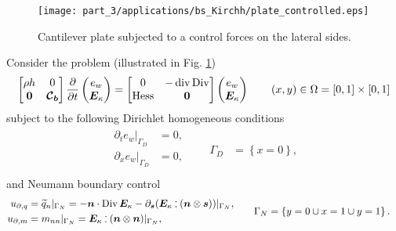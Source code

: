 \begin{figure}[t]
	\centering
	\texttt{[image: part\_3/applications/bs\_Kirchh/plate\_controlled.eps]}
	\caption{Cantilever plate subjected to a control forces on the lateral sides.}
	\label{fig:plate_controlled}
\end{figure}

Consider the problem (illustrated in Fig. \ref{fig:plate_controlled})
\begin{equation*}
\begin{bmatrix}
\rho h & 0 \\ 
\bm{0} & \bm{\mathcal{C}_b} \\
\end{bmatrix}
\diffp{}{t}
\begin{pmatrix}
e_w \\ \bm{E}_\kappa \\
\end{pmatrix} = 
\begin{bmatrix}
0 & -\div\Div \\ 
\Hess & \bm{0} \\
\end{bmatrix}
\begin{pmatrix}
e_w \\ \bm{E}_\kappa \\
\end{pmatrix} \qquad (x, y) \in \Omega = [0, 1]\times[0,1]
\end{equation*}
subject to the following Dirichlet homogeneous conditions
\begin{align*}
\begin{aligned}
\partial_t e_w|_{\Gamma_D} &= 0, \\
\partial_x e_w|_{\Gamma_D} &= 0, \\
\end{aligned} \qquad {\Gamma_D} &= \left\{x = 0 \right\},
\end{align*}
and Neumann boundary control
\begin{align*}
\begin{aligned}
u_{\partial, q} & = \widetilde{q}_n|_{\Gamma_N} = -\bm{n} \cdot \Div \bm{E}_\kappa - \partial_{\bm{s}} (\bm{E}_\kappa \cddot (\bm{n} \otimes \bm{s}))|_{\Gamma_N},\\
u_{\partial, m} &= m_{nn}|_{\Gamma_N} =\bm{E}_\kappa \cddot (\bm{n}\otimes \bm{n})|_{\Gamma_N}, \; \\
\end{aligned} \qquad {\Gamma_N} &= \left\{y = 0 \cup x=1 \cup y=1 \right\}.
\end{align*}
